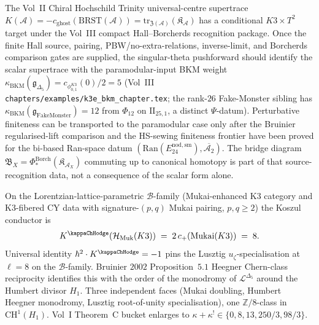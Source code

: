 \begin{remark}
\label{rem:thqg-pf-phi-trace}
The Vol~II Chiral Hochschild Trinity universal-centre supertrace
$K(\mathcal{A}) = -c_{\mathrm{ghost}}(\mathrm{BRST}(\mathcal{A}))
= \mathrm{tr}_{\mathfrak{Z}(\mathcal{A})}(\mathfrak{K}_{\mathcal{A}})$
has a conditional $K3 \times T^2$ target under the Vol~III compact
Hall--Borcherds recognition package.  Once the finite Hall source,
pairing, PBW/no-extra-relations, inverse-limit, and Borcherds comparison
gates are supplied, the singular-theta pushforward should identify the
scalar supertrace with the paramodular-input BKM weight
$\kappa_{\mathrm{BKM}}(\mathfrak{g}_{\Delta_5})
= c_{\phi_{0,1}^{K3}}(0)/2 = 5$ (Vol~III
\texttt{chapters/examples/k3e\_bkm\_chapter.tex}; the rank-$26$
Fake-Monster sibling has
$\kappa_{\mathrm{BKM}}(\mathfrak{g}_{\mathrm{FakeMonster}}) = 12$ from
$\Phi_{12}$ on $\mathrm{II}_{25,1}$, a distinct $\Psi$-datum).
Perturbative finiteness can be transported to the paramodular case only
after the Bruinier regularised-lift comparison and the HS-sewing
finiteness frontier have been proved for the bi-based Ran-space datum
$(\mathrm{Ran}(E^{\mathrm{nod,sm}}_{24}), \overline{\mathcal{A}_2})$.
The bridge diagram
$\mathfrak{B}_X = \Phi^{\mathrm{Borch}}_*(\mathfrak{K}_{\mathcal{A}_X})$
commuting up to canonical homotopy is part of that source-recognition
data, not a consequence of the scalar form alone.
\end{remark}

\begin{remark}[$K^{\kappaChHodge} = 8$ Mukai doubling on the $\mathcal{B}$-family]
\label{rem:thqg-pf-Kkappa-8}
On the Lorentzian-lattice-parametric $\mathcal{B}$-family (Mukai-enhanced K3 category and K3-fibered CY data with signature-$(p, q)$ Mukai pairing, $p, q \geq 2$) the Koszul conductor is
\[
 K^{\kappaChHodge}(\mathcal{H}_{\mathrm{Muk}}(K3)) \;=\; 2\,c_+(\mathrm{Mukai}(K3)) \;=\; 8.
\]
Universal identity $\hbar^2 \cdot K^{\kappaChHodge} = -1$ pins the Lusztig $u_\zeta$-specialisation at $\ell = 8$ on the $\mathcal{B}$-family. Bruinier $2002$ Proposition~$5.1$ Heegner Chern-class reciprocity identifies this with the order of the monodromy of $\mathcal{L}^{\Delta_5}$ around the Humbert divisor $H_1$. Three independent faces (Mukai doubling, Humbert Heegner monodromy, Lusztig root-of-unity specialisation), one $\mathbb{Z}/8$-class in $\mathrm{CH}^1(H_1)$. Vol~I Theorem~C bucket enlarges to $\kappa + \kappa^! \in \{0, 8, 13, 250/3, 98/3\}$.
\end{remark}

